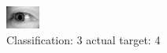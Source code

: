 \begin{figure}[h!]
\begin{center}
\includegraphics[width=0.60\columnwidth]{figures/ID3158_class_3_target_4.png}
\end{center}
\caption{ Classification: 3 actual target: 4}
\label{fig:ID3158_class_3_target_4}
\end{figure}
